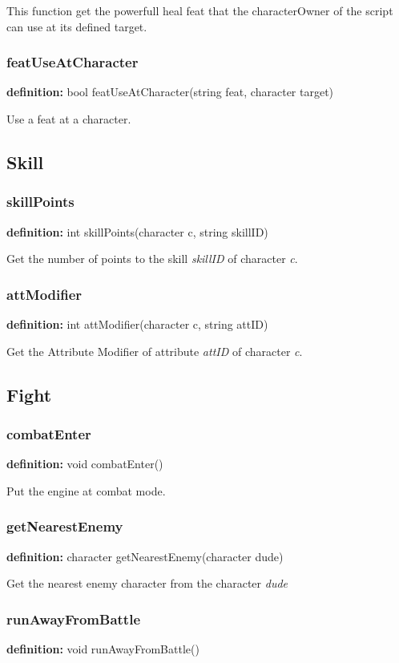 \documentclass[ letterpaper,12pt]{article}
\begin{document}
This function get the powerfull heal feat that the characterOwner
of the script can use at its defined target.

\subsubsection{featUseAtCharacter}
{\bf definition:} bool featUseAtCharacter(string feat, character target)

Use a feat at a character.

\subsection{Skill}

\subsubsection{skillPoints}
{\bf definition:} int skillPoints(character c, string skillID)

Get the number of points to the skill {\it skillID} of character {\it c}.

\subsubsection{attModifier}
{\bf definition:} int attModifier(character c, string attID)

Get the Attribute Modifier of attribute {\it attID} of character {\it c}.

\subsection{Fight}

\subsubsection{combatEnter}
{\bf definition:} void combatEnter()

Put the engine at combat mode.

\subsubsection{getNearestEnemy}
{\bf definition:} character getNearestEnemy(character dude)

Get the nearest enemy character from the character {\it dude}

\subsubsection{runAwayFromBattle}
{\bf definition:} void runAwayFromBattle()
\end{document}

